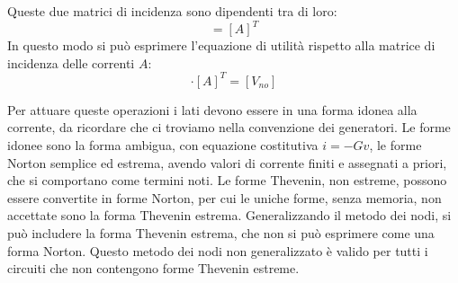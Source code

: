 \documentclass{article}
\numberwithin{equation}{subsection}
\begin{document}
Queste due matrici di incidenza sono dipendenti tra di loro:
\begin{equation*}
    [B]=[A]^T
\end{equation*}
In questo modo si può esprimere l'equazione di utilità rispetto alla matrice di incidenza delle correnti $A$:
\begin{equation*}
    [v_l]\cdot[A]^T=[V_{no}]
\end{equation*}

Per attuare queste operazioni i lati devono essere in una forma idonea alla corrente, da ricordare che ci troviamo nella convenzione dei generatori. 
Le forme idonee sono la forma ambigua, con equazione costitutiva $i=-Gv$, le forme Norton semplice ed estrema, avendo valori di corrente finiti e assegnati a priori, che si 
comportano come termini noti. Le forme Thevenin, non estreme, possono essere convertite in forme Norton, per cui le uniche forme, senza memoria, non accettate sono 
la forma Thevenin estrema. Generalizzando il metodo dei nodi, si può includere la forma Thevenin estrema, che non si può esprimere come una forma Norton. 
Questo metodo dei nodi non generalizzato è valido per tutti i circuiti che non contengono forme Thevenin estreme. 
\end{document}
